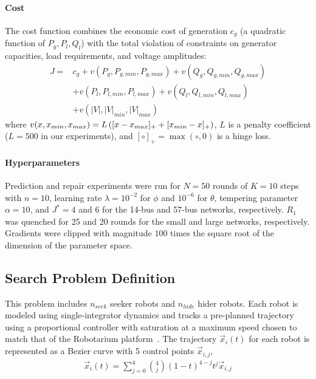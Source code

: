 \paragraph{Cost} The cost function combines the economic cost of generation $c_g$ (a quadratic function of $P_g, P_l, Q_l$) with the total violation of constraints on generator capacities, load requirements, and voltage amplitudes:
\begin{align}
    J = & c_g + v(P_g, P_{g, min}, P_{g, max}) + v(Q_g, Q_{g, min}, Q_{g, max}) \\
        & + v(P_l, P_{l, min}, P_{l, max}) + v(Q_l, Q_{l, min}, Q_{l, max})     \\
        & + v(|V|, |V|_{min}, |V|_{max}) \label{eq:scopf_cost}
\end{align}
where $v(x, x_{min}, x_{max}) = L\left( [x - x_{max}]_+ + [x_{min} - x]_+ \right)$, $L$ is a penalty coefficient ($L=500$ in our experiments), and $[\circ]_+ = \max(\circ, 0)$ is a hinge loss.

\paragraph{Hyperparameters} Prediction and repair experiments were run for $N=50$ rounds of $K=10$ steps with $n=10$, learning rate $\lambda = 10^{-2}$ for $\phi$ and $10^{-6}$ for $\theta$, tempering parameter $\alpha = 10$, and $J^* = 4$ and $6$ for the 14-bus and 57-bus networks, respectively. $R_1$ was quenched for 25 and 20 rounds for the small and large networks, respectively. Gradients were clipped with magnitude $100$ times the square root of the dimension of the parameter space.

\subsection{Search Problem Definition}

This problem includes $n_{seek}$ seeker robots and $n_{hide}$ hider robots. Each robot is modeled using single-integrator dynamics and tracks a pre-planned trajectory using a proportional controller with saturation at a maximum speed chosen to match that of the Robotarium platform~\cite{wilsonRobotariumGloballyImpactful2020}. The trajectory $\vec{x}_i(t)$ for each robot is represented as a Bezier curve with 5 control points $\vec{x}_{i, j}$,
\begin{align*}
    \vec{x}_i(t) = \sum_{j=0}^4 \binom{4}{j}(1-t)^{4-j}t^j \vec{x}_{i, j}
\end{align*}

